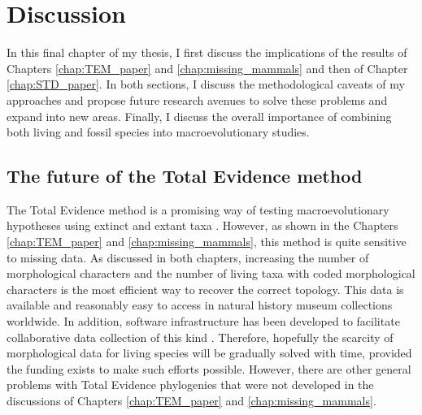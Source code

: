 \chapter{Discussion}
\label{chap:discussion}

%
%

In this final chapter of my thesis, I first discuss the implications of the results of Chapters \ref{chap:TEM_paper} and \ref{chap:missing_mammals} and then of Chapter \ref{chap:STD_paper}.
In both sections, I discuss the methodological caveats of my approaches and propose future research avenues to solve these problems and expand into new areas.
Finally, I discuss the overall importance of combining both living and fossil species into macroevolutionary studies.

\section{The future of the Total Evidence method}
The Total Evidence method is a promising way of testing macroevolutionary hypotheses using extinct and extant taxa \citep[e.g.][]{ronquista2012,Slater2012MEE,Wood01032013,beckancient2014,Dembo2015}.
However, as shown in the Chapters \ref{chap:TEM_paper} and \ref{chap:missing_mammals}, this method is quite sensitive to missing data.
As discussed in both chapters, increasing the number of morphological characters and the number of living taxa with coded morphological characters is the most efficient way to recover the correct topology.
This data is available and reasonably easy to access in natural history museum collections worldwide. 
In addition, software infrastructure has been developed to facilitate collaborative data collection of this kind \citep{morphobank}.
Therefore, hopefully the scarcity of morphological data for living species will be gradually solved with time, provided the funding exists to make such efforts possible.
However, there are other general problems with Total Evidence phylogenies that were not developed in the discussions of Chapters \ref{chap:TEM_paper} and \ref{chap:missing_mammals}. 

